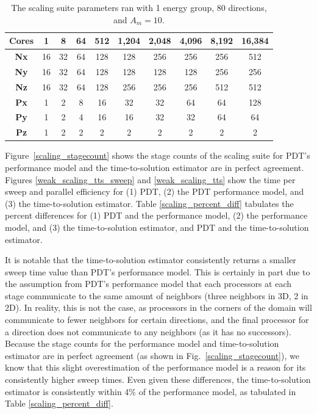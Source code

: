 \documentclass[times,final]{elsarticle}
\begin{document}
\begin{table}[H]
  \centering
  \caption{The scaling suite parameters ran with 1 energy group, 80 directions, and $A_m = 10$.}
  \label{scaling_suite}
  \begin{tabular}{c|c|c|c|c|c|c|c|c|c}
    \textbf{Cores} & 1 & 8 & 64 & 512 & 1,204 & 2,048 & 4,096 & 8,192 & 16,384 \\ \hline
    \textbf{Nx} & 16 & 32 & 64 & 128 & 128 & 256 & 256 & 256 & 512 \\ \hline
    \textbf{Ny} & 16 & 32 & 64 & 128 & 128 & 128 & 128 & 256 & 256 \\ \hline
    \textbf{Nz} & 16 & 32 & 64 & 128 & 256 & 256 & 256 & 512 & 512 \\ \hline
    \textbf{Px} & 1  & 2  & 8  & 16  & 32  & 32  & 64  & 64  & 128 \\ \hline
    \textbf{Py} & 1  & 2  & 4  & 16  & 16  & 32  & 32  & 64  & 64  \\ \hline
    \textbf{Pz} & 1  & 2  & 2  & 2   & 2   & 2   & 2   & 2   & 2   \\
  \end{tabular}
\end{table}

Figure~\ref{scaling_stagecount} shows the stage counts of the scaling suite for PDT's performance model and the time-to-solution estimator are in perfect agreement.
Figures \ref{weak_scaling_tts_sweep} and \ref{weak_scaling_tts} show the time per sweep and parallel efficiency for (1) PDT, (2) the PDT performance model, and (3) the time-to-solution estimator. Table \ref{scaling_percent_diff} tabulates the percent differences for (1) PDT and the performance model, (2) the performance model, and (3) the time-to-solution estimator, and PDT and the time-to-solution estimator.

It is notable that the time-to-solution estimator consistently returns a smaller sweep time value than PDT's performance model. This is certainly in part due to the assumption from PDT's performance model that each processors at each stage communicate to the same amount of neighbors (three neighbors in 3D, 2 in 2D).
In reality, this is not the case, as processors in the corners of the domain will communicate to fewer neighbors for certain directions, and the final processor for a direction does not communicate to any neighbors (as it has no successors).
Because the stage counts for the performance model and time-to-solution estimator are in perfect agreement (as shown in Fig.~\ref{scaling_stagecount}), we know that this slight overestimation of the performance model is a reason for its consistently higher sweep times.
Even given these differences, the time-to-solution estimator is consistently within 4\% of the performance model, as tabulated in Table \ref{scaling_percent_diff}.
\end{document}
